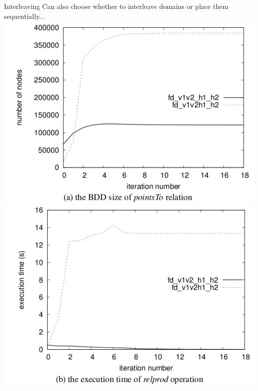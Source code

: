 \documentclass{beamer}
\begin{document}
\begin{frame}{Interleaving}
Can also choose whether to interleave domains or place them sequentially... \\
\includegraphics[scale=0.25]{interleaving-1.png} \qquad
\includegraphics[scale=0.25]{interleaving-2.png}
\end{frame}
\end{document}

